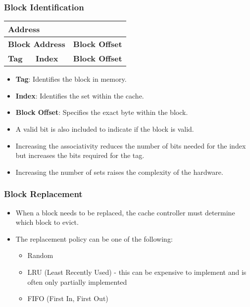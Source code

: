 
\begin{frame}
    \frametitle{Block Identification}
    \begin{table}[h!]
        \centering
        \begin{tabular}{|p{5cm}|p{3cm}|p{3cm}|}
            \hline
            \multicolumn{3}{|p{11cm}|}{\textbf{Address}} \\
            \hline
            \multicolumn{2}{|p{8cm}|}{\textbf{Block Address}} & \multicolumn{1}{p{3cm}|}{\textbf{Block Offset}} \\
            \hline
            \multicolumn{1}{|p{5cm}|}{\textbf{Tag}} & \multicolumn{1}{|p{3cm}|}{\textbf{Index}} & \multicolumn{1}{p{3cm}|}{\textbf{Block Offset}} \\
            \hline
        \end{tabular}
    \end{table}
    \begin{itemize}
        \item \textbf{Tag}: Identifies the block in memory.
        \item \textbf{Index}: Identifies the set within the cache.
        \item \textbf{Block Offset}: Specifies the exact byte within the block.
        \item A valid bit is also included to indicate if the block is valid.
        \item Increasing the associativity reduces the number of bits needed for the index but increases the bits required for the tag.
        \item Increasing the number of sets raises the complexity of the hardware.
    \end{itemize}
\end{frame}


\begin{frame}
    \frametitle{Block Replacement}
    \begin{itemize}
        \item When a block needs to be replaced, the cache controller must determine which block to evict.
        \item The replacement policy can be one of the following:
        \begin{itemize}
            \item Random
            \item LRU (Least Recently Used) - this can be expensive to implement and is often only partially implemented
            \item FIFO (First In, First Out)
        \end{itemize}
    \end{itemize}
\end{frame}

